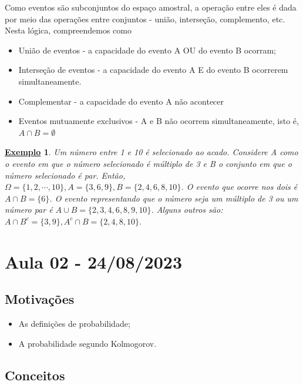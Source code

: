 \documentclass{article}
\newtheorem{example}{\underline{Exemplo}}
\begin{document}
  Como eventos são subconjuntos do espaço amostral, a operação entre eles é dada por meio das operações entre conjuntos - 
união, interseção, complemento, etc. Nesta lógica, compreendemos como
\begin{itemize}
  \item[] União de eventos - a capacidade do evento A OU do evento B ocorram;
  \item[] Interseção de eventos - a capacidade do evento A E do evento B ocorrerem simultaneamente.
  \item[] Complementar - a capacidade do evento A não acontecer
  \item[] Eventos mutuamente exclusivos - A e B não ocorrem simultaneamente, isto é, \(A\cap B = \emptyset\)
\end{itemize}
\begin{example}
  Um número entre 1 e 10 é selecionado ao acado. Considere A como o evento em que o número selecionado é múltiplo de 3 e B o conjunto em que o número selecionado é par. Então, 
 \(\Omega = \{1, 2, \cdots, 10\}, A = \{3, 6, 9\}, B = \{2, 4, 6, 8, 10\}\). O evento que ocorre nos dois é \(A\cap B=\{6\}\). O evento representando que o número seja um múltiplo de 3 ou
 um número par é \(A\cup B = \{2, 3, 4, 6, 8, 9, 10\}\). Alguns outros são: \(A\cap B^{c} = \{3, 9\}, A^{c}\cap B = \{2, 4, 8, 10\}.\)
\end{example}
\newpage
\section{Aula 02 - 24/08/2023}
\subsection{Motivações}
\begin{itemize}
  \item As definições de probabilidade;
  \item A probabilidade segundo Kolmogorov.
\end{itemize}
\subsection{Conceitos}
\end{document}
